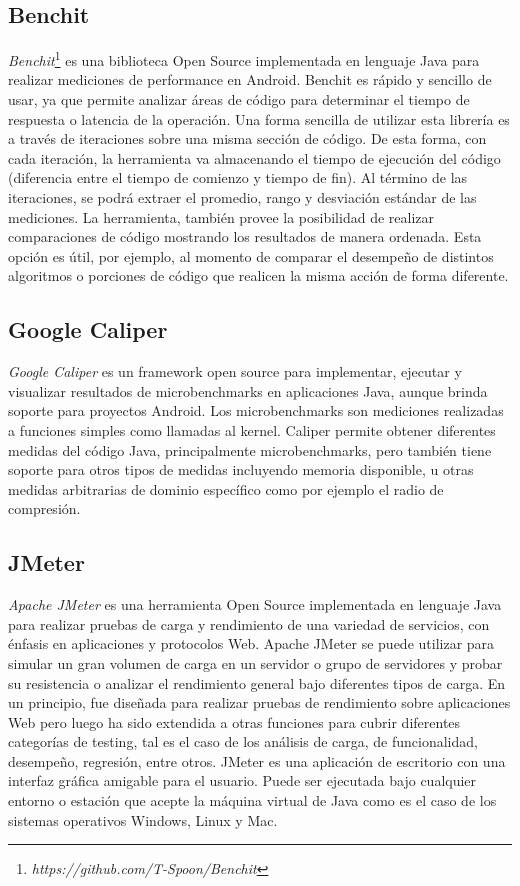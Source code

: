 \subsection*{Benchit\label{sub:Benchit}}

\emph{Benchit}\footnote{\emph{https://github.com/T-Spoon/Benchit}}
es una biblioteca Open Source implementada en lenguaje Java para realizar
mediciones de performance en Android. Benchit es rápido y sencillo
de usar, ya que permite analizar áreas de código para determinar el
tiempo de respuesta o latencia de la operación. Una forma sencilla
de utilizar esta librería es a través de iteraciones sobre una misma
sección de código. De esta forma, con cada iteración, la herramienta
va almacenando el tiempo de ejecución del código (diferencia entre
el tiempo de comienzo y tiempo de fin). Al término de las iteraciones,
se podrá extraer el promedio, rango y desviación estándar de las mediciones.
La herramienta, también provee la posibilidad de realizar comparaciones
de código mostrando los resultados de manera ordenada. Esta opción
es útil, por ejemplo, al momento de comparar el desempeño de distintos
algoritmos o porciones de código que realicen la misma acción de forma
diferente. 


\subsection*{Google Caliper \label{sub:Google-caliper}}

\emph{Google Caliper} es un framework open source para implementar,
ejecutar y visualizar resultados de microbenchmarks en aplicaciones
Java, aunque brinda soporte para proyectos Android. Los microbenchmarks
son mediciones realizadas a funciones simples como llamadas al kernel.
Caliper permite obtener diferentes medidas del código Java, principalmente
microbenchmarks, pero también tiene soporte para otros tipos de medidas
incluyendo memoria disponible, u otras medidas arbitrarias de dominio
específico como por ejemplo el radio de compresión. 


\subsection*{JMeter\label{sub:JMeter}}

\emph{Apache JMeter} es una herramienta Open Source implementada en
lenguaje Java para realizar pruebas de carga y rendimiento de una
variedad de servicios, con énfasis en aplicaciones y protocolos Web.
Apache JMeter se puede utilizar para simular un gran volumen de carga
en un servidor o grupo de servidores y probar su resistencia o analizar
el rendimiento general bajo diferentes tipos de carga. En un principio,
fue diseñada para realizar pruebas de rendimiento sobre aplicaciones
Web pero luego ha sido extendida a otras funciones para cubrir diferentes
categorías de testing, tal es el caso de los análisis de carga, de
funcionalidad, desempeño, regresión, entre otros. JMeter es una aplicación
de escritorio con una interfaz gráfica amigable para el usuario. Puede
ser ejecutada bajo cualquier entorno o estación que acepte la máquina
virtual de Java como es el caso de los sistemas operativos Windows,
Linux y Mac.

